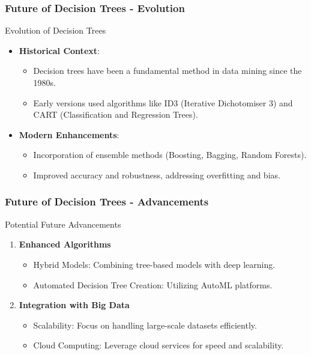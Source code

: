 \documentclass[aspectratio=169]{beamer}
\begin{document}
\begin{frame}[fragile]
    \frametitle{Future of Decision Trees - Evolution}
    \begin{block}{Evolution of Decision Trees}
        \begin{itemize}
            \item \textbf{Historical Context}: 
            \begin{itemize}
                \item Decision trees have been a fundamental method in data mining since the 1980s.
                \item Early versions used algorithms like ID3 (Iterative Dichotomiser 3) and CART (Classification and Regression Trees).
            \end{itemize}
            
            \item \textbf{Modern Enhancements}: 
            \begin{itemize}
                \item Incorporation of ensemble methods (Boosting, Bagging, Random Forests).
                \item Improved accuracy and robustness, addressing overfitting and bias.
            \end{itemize}
        \end{itemize}
    \end{block}
\end{frame}

\begin{frame}[fragile]
    \frametitle{Future of Decision Trees - Advancements}
    \begin{block}{Potential Future Advancements}
        \begin{enumerate}
            \item \textbf{Enhanced Algorithms}
            \begin{itemize}
                \item Hybrid Models: Combining tree-based models with deep learning.
                \item Automated Decision Tree Creation: Utilizing AutoML platforms.
            \end{itemize}
            
            \item \textbf{Integration with Big Data}
            \begin{itemize}
                \item Scalability: Focus on handling large-scale datasets efficiently.
                \item Cloud Computing: Leverage cloud services for speed and scalability.
            \end{itemize}
        \end{enumerate}
    \end{block}
\end{frame}
\end{document}
